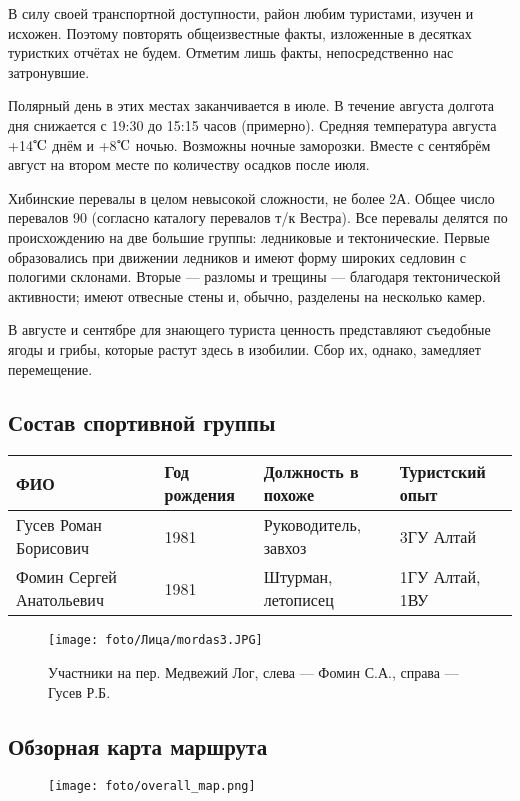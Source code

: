 В силу своей транспортной доступности, район любим туристами, изучен и исхожен.
Поэтому повторять общеизвестные факты, изложенные в десятках туристких отчётах не будем.
Отметим лишь факты, непосредственно нас затронувшие.

Полярный день в этих местах заканчивается в июле. В течение августа долгота дня снижается с
19:30 до 15:15 часов (примерно). Средняя температура августа +14$\tccentigrade$ днём и +8$\tccentigrade$ ночью.
Возможны ночные заморозки. Вместе с сентябрём август на втором месте по количеству осадков после июля.

Хибинские перевалы в целом невысокой сложности, не более 2А. Общее число перевалов 90 (согласно каталогу
перевалов т/к Вестра). Все перевалы делятся по происхождению на две большие группы: ледниковые и тектонические.
Первые образовались при движении ледников и имеют форму широких седловин с пологими склонами.
Вторые --- разломы и трещины --- благодаря тектонической активности;
имеют отвесные стены и, обычно, разделены на несколько камер.

В августе и сентябре для знающего туриста ценность представляют съедобные ягоды и грибы, которые растут здесь в изобилии.
Сбор их, однако, замедляет перемещение.

\subsection{Состав спортивной группы}
\begin{tabular}{|l|l|l|l|}
    \hline
    ФИО & Год рождения & Должность в похоже & Туристский опыт\\
    \hline
    Гусев Роман Борисович &
    1981 &
    Руководитель, завхоз &
	3ГУ Алтай
    \\
    \hline
    Фомин Сергей Анатольевич &
    1981 &
    Штурман, летописец &
	1ГУ Алтай, 1ВУ
    \\
    \hline
\end{tabular}

\begin{figure}[H]
    \texttt{[image: foto/Лица/mordas3.JPG]}
    \caption*{Участники на пер. Медвежий Лог, слева --- Фомин С.А., справа --- Гусев Р.Б.}
\end{figure}

\subsection{Обзорная карта маршрута}
\begin{figure}[H]
    \texttt{[image: foto/overall\_map.png]}
\end{figure}



